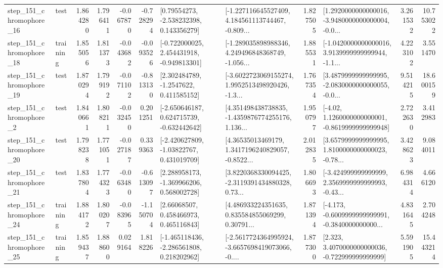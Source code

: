 \begin{tabular}{llrrrrllrlrr}
  step\_151\_chromophore\_16 &      test &      1.864280 &    1.796411 &     -0.067870 & -0.728294 &     [0.79554273, -2.538232398, 0.143356279] &  [-1.227116645527409, 4.184561113744467, -0.809... &       1.827505 &  [1.2920000000000016, -3.9480000000000004, -0.0... &            3.261532 &         10.753022 \\
  step\_151\_chromophore\_18 &  training &      1.855056 &    1.811373 &     -0.043682 & -0.093526 &   [-0.722000025, 2.454431918, -0.949813301] &  [-1.289035898988346, 4.249496848368749, -1.056... &       1.885531 &  [-1.0420000000000016, 3.9139999999999944, -1.1... &            4.223102 &          3.551470 \\
  step\_151\_chromophore\_19 &      test &      1.870294 &    1.799192 &     -0.071102 & -0.813130 &      [2.302484789, -1.2547622, 0.411585152] &  [-3.6022723069155274, 1.9952513498920426, -1.3... &       1.767354 &  [3.4879999999999995, -2.0830000000000055, -0.0... &            9.514215 &         18.600159 \\
   step\_151\_chromophore\_2 &      test &      1.840661 &    1.808211 &     -0.032450 &  0.201251 &   [-2.650646187, 0.624715739, -0.632442642] &  [4.351498438738835, -1.4359876774255176, 1.136... &       1.950797 &   [-4.02, 1.1260000000000001, -0.8619999999999948] &            2.722630 &          3.412983 \\
  step\_151\_chromophore\_20 &      test &      1.798238 &    1.771051 &     -0.027187 &  0.339363 &    [-2.420627809, -1.03822767, 0.431019709] &  [4.36535013469179, 1.3417196240829057, -0.8522... &       2.012835 &  [3.6579999999999995, 1.8100000000000023, -0.78... &            3.428623 &          9.084011 \\
  step\_151\_chromophore\_21 &      test &      1.837804 &    1.774323 &     -0.063480 & -0.613097 &    [2.288958173, -1.369966206, 0.568002728] &  [3.8220368330094425, -2.3119391434880328, 0.73... &       1.806693 &  [-3.424999999999999, 2.3569999999999993, -0.43... &            6.984314 &          4.666120 \\
  step\_151\_chromophore\_24 &  training &      1.884172 &    1.800207 &     -0.083965 & -1.150704 &      [2.66068507, 0.458466973, 0.465116843] &  [4.486933224351635, 0.835584855069299, 0.30791... &       1.871394 &  [-4.173, -0.6009999999999991, -0.3840000000000... &            4.831645 &          2.704248 \\
  step\_151\_chromophore\_25 &  training &      1.859437 &    1.888600 &      0.029164 &  1.818226 &   [-1.465118436, -2.286561808, 0.218202962] &  [-2.5617724364995924, -3.6657698419073066, -0.... &       1.877300 &    [2.323, 3.4070000000000036, -0.722999999999999] &            5.591905 &         15.443214 \\

\end{tabular}
